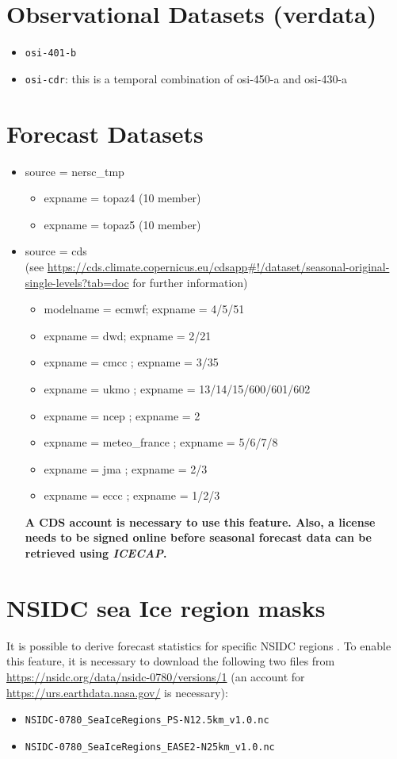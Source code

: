 \documentclass[DIV=10, parskip=full]{scrreprt}
\newcommand{\ice}{\textit{ICECAP}\xspace}
\begin{document}
\section{Observational Datasets (verdata)}

\begin{itemize}
		\item \texttt{osi-401-b}
		\item \texttt{osi-cdr}: this is a temporal combination of osi-450-a and osi-430-a
\end{itemize}
	
\section{Forecast Datasets}
\begin{itemize}
	\item source = nersc\_tmp
	\begin{itemize}
		\item expname = topaz4 (10 member)
		\item expname = topaz5 (10 member)
	\end{itemize}
	\item source = cds \\
	(see \url{https://cds.climate.copernicus.eu/cdsapp#!/dataset/seasonal-original-single-levels?tab=doc} for further information)
	\begin{itemize}
		\item modelname = ecmwf; expname = 4/5/51
		\item expname = dwd; expname = 2/21
		\item expname = cmcc ; expname = 3/35
		\item expname = ukmo ; expname = 13/14/15/600/601/602
		\item expname = ncep ; expname = 2
		\item expname = meteo\_france ; expname = 5/6/7/8
		\item expname = jma ; expname = 2/3
		\item expname = eccc ; expname = 1/2/3
	\end{itemize}
	\textbf{A CDS account is necessary to use this feature. Also, a license needs to be signed online before seasonal forecast data can be retrieved using \ice.}
\end{itemize}

\section{NSIDC sea Ice region masks}
\label{sec:nsidc}
It is possible to derive forecast statistics for specific NSIDC regions \citep{Meier2023}. To enable this feature, it is necessary to download the following two files from \url{https://nsidc.org/data/nsidc-0780/versions/1} (an account for \url{https://urs.earthdata.nasa.gov/} is necessary):
\begin{itemize}
	\item \texttt{NSIDC-0780\_SeaIceRegions\_PS-N12.5km\_v1.0.nc} 
	\item  \texttt{NSIDC-0780\_SeaIceRegions\_EASE2-N25km\_v1.0.nc} 
\end{itemize}
\end{document}
